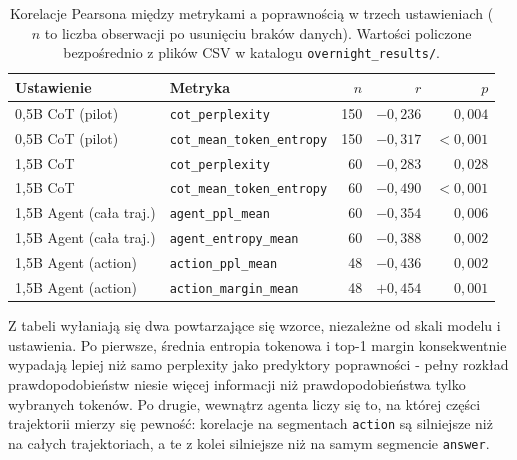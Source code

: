 \begin{table}[h]
\centering
\small
\begin{tabular}{llrrr}
\toprule
\textbf{Ustawienie} & \textbf{Metryka} & $n$ & $r$ & $p$ \\
\midrule
0,5B CoT (pilot)        & \texttt{cot\_perplexity}           & 150 & $-0{,}236$ & $0{,}004$ \\
0,5B CoT (pilot)        & \texttt{cot\_mean\_token\_entropy} & 150 & $-0{,}317$ & $<0{,}001$ \\
1,5B CoT                & \texttt{cot\_perplexity}           & 60  & $-0{,}283$ & $0{,}028$ \\
1,5B CoT                & \texttt{cot\_mean\_token\_entropy} & 60  & $-0{,}490$ & $<0{,}001$ \\
1,5B Agent (cała traj.) & \texttt{agent\_ppl\_mean}          & 60  & $-0{,}354$ & $0{,}006$ \\
1,5B Agent (cała traj.) & \texttt{agent\_entropy\_mean}      & 60  & $-0{,}388$ & $0{,}002$ \\
1,5B Agent (action)     & \texttt{action\_ppl\_mean}         & 48  & $-0{,}436$ & $0{,}002$ \\
1,5B Agent (action)     & \texttt{action\_margin\_mean}      & 48  & $+0{,}454$ & $0{,}001$ \\
\bottomrule
\end{tabular}
\caption{Korelacje Pearsona między metrykami a poprawnością
w trzech ustawieniach ($n$ to liczba obserwacji po usunięciu
braków danych). Wartości policzone bezpośrednio z plików CSV
w katalogu \texttt{overnight\_results/}.}
\label{tab:headline}
\end{table}

Z tabeli wyłaniają się dwa powtarzające się wzorce, niezależne
od skali modelu i ustawienia. Po pierwsze, średnia entropia tokenowa
i top-1 margin konsekwentnie wypadają lepiej niż samo perplexity
jako predyktory poprawności - pełny rozkład prawdopodobieństw
niesie więcej informacji niż prawdopodobieństwa tylko wybranych
tokenów. Po drugie, wewnątrz agenta liczy się to, na której części
trajektorii mierzy się pewność: korelacje na segmentach
\texttt{action} są silniejsze niż na całych trajektoriach, a te
z kolei silniejsze niż na samym segmencie \texttt{answer}.
